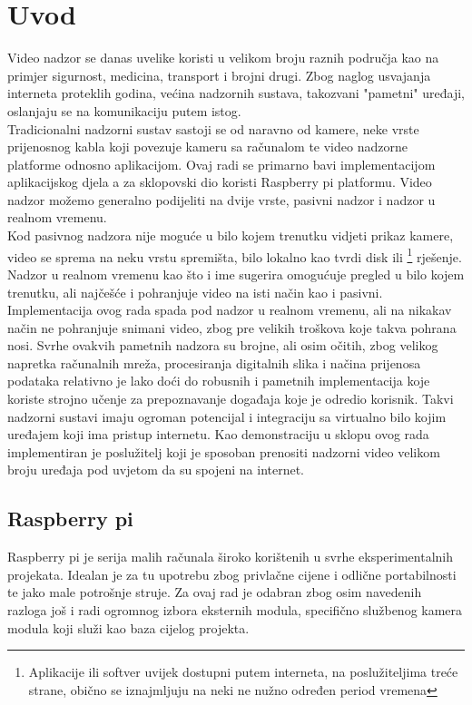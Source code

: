 \section{Uvod}
Video nadzor se danas uvelike koristi u velikom broju raznih područja kao na primjer sigurnost, medicina, transport
i brojni drugi.
\paraBreak
Zbog naglog usvajanja interneta proteklih godina, većina nadzornih sustava, takozvani "pametni" uređaji, oslanjaju se
na komunikaciju putem istog. \\
Tradicionalni nadzorni sustav sastoji se od naravno od kamere, neke vrste prijenosnog kabla koji povezuje kameru sa
računalom te video nadzorne platforme odnosno aplikacijom. Ovaj radi se primarno bavi implementacijom aplikacijskog djela a 
za sklopovski dio koristi Raspberry pi platformu.
\paraBreak
Video nadzor možemo generalno podijeliti na dvije vrste, pasivni nadzor i nadzor u realnom vremenu. \\
Kod pasivnog nadzora nije moguće u bilo kojem trenutku vidjeti prikaz kamere, video se sprema na neku vrstu spremišta, bilo
lokalno kao tvrdi disk ili 
\footnote
{
  Aplikacije ili softver uvijek dostupni putem interneta, na poslužiteljima treće strane, obično se iznajmljuju na neki ne nužno
  određen period vremena 
}
rješenje. \\
Nadzor u realnom vremenu kao što i ime sugerira omogućuje pregled u bilo kojem trenutku, ali najčešće i pohranjuje
video na isti način kao i pasivni. \\
Implementacija ovog rada spada pod nadzor u realnom vremenu, ali na nikakav način ne pohranjuje snimani video, zbog pre velikih
troškova koje takva pohrana nosi. 
\paraBreak
Svrhe ovakvih pametnih nadzora su brojne, ali osim očitih, zbog velikog napretka računalnih mreža, procesiranja digitalnih
slika i načina prijenosa podataka relativno je lako doći do robusnih i pametnih implementacija koje koriste strojno učenje
za prepoznavanje događaja koje je odredio korisnik. Takvi nadzorni sustavi imaju ogroman potencijal i integraciju sa virtualno
bilo kojim uređajem koji ima pristup internetu. Kao demonstraciju u sklopu ovog rada implementiran je poslužitelj
koji je sposoban prenositi nadzorni video velikom broju uređaja pod uvjetom da su spojeni na internet.

\pagebreak
\subsection{Raspberry pi}
Raspberry pi je serija malih  
računala široko korištenih u svrhe eksperimentalnih projekata. \cite{rPiBook}
\paraBreak
Idealan je za tu upotrebu zbog privlačne cijene i odlične portabilnosti te jako male potrošnje struje.
\paraBreak
Za ovaj rad je odabran zbog osim navedenih razloga još i radi ogromnog izbora eksternih modula, specifično službenog kamera modula
koji služi kao baza cijelog projekta.

